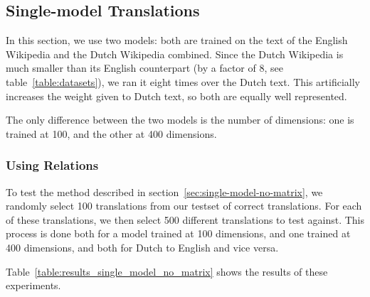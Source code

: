 \subsection{Single-model Translations}
In this section, we use two models: both are trained on the text of the English Wikipedia and the Dutch Wikipedia combined. Since the Dutch Wikipedia is much smaller than its English counterpart (by a factor of 8, see table~\ref{table:datasets}), we ran it eight times over the Dutch text. This artificially increases the weight given to Dutch text, so both are equally well represented.

The only difference between the two models is the number of dimensions: one is trained at 100, and the other at 400 dimensions.

\subsubsection{Using Relations}
To test the method described in section~\ref{sec:single-model-no-matrix}, we randomly select 100 translations from our testset of correct translations. For each of these translations, we then select 500 different translations to test against. This process is done both for a model trained at 100 dimensions, and one trained at 400 dimensions, and both for Dutch to English and vice versa.

Table~\ref{table:results_single_model_no_matrix} shows the results of these experiments.

